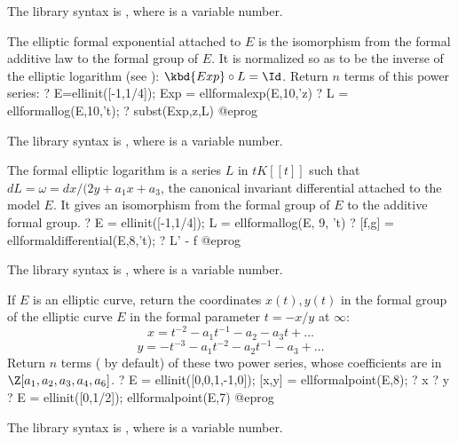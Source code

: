 The library syntax is , where  is a variable number.

\label{se:ellformalexp}
The elliptic formal exponential  attached to $E$ is the
isomorphism from the formal additive law to the formal group of $E$. It is
normalized so as to be the inverse of the elliptic logarithm (see
): $\kbd{Exp} \circ L = \Id$. Return $n$ terms of this
power series:
\bprog
? E=ellinit([-1,1/4]); Exp = ellformalexp(E,10,'z)
? L = ellformallog(E,10,'t);
? subst(Exp,z,L)
@eprog

The library syntax is , where  is a variable number.

\label{se:ellformallog}
The formal elliptic logarithm is a series $L$ in $t K[[t]]$
such that $d L = \omega = dx / (2y + a_1x + a_3$, the canonical invariant
differential attached to the model $E$. It gives an isomorphism
from the formal group of $E$ to the additive formal group.
\bprog
? E = ellinit([-1,1/4]); L = ellformallog(E, 9, 't)
? [f,g] = ellformaldifferential(E,8,'t);
? L' - f
@eprog

The library syntax is , where  is a variable number.

\label{se:ellformalpoint}
If $E$ is an elliptic curve, return the coordinates $x(t), y(t)$ in the
formal group of the elliptic curve $E$ in the formal parameter $t = -x/y$
at $\infty$:
$$ x = t^{-2} -a_1 t^{-1} - a_2 - a_3 t + \dots $$
$$ y = - t^{-3} -a_1 t^{-2} - a_2t^{-1} -a_3 + \dots $$
Return $n$ terms ( by default) of these two power
series, whose coefficients are in $\Z[a_1,a_2,a_3,a_4,a_6]$.
\bprog
? E = ellinit([0,0,1,-1,0]); [x,y] = ellformalpoint(E,8);
? x
? y
? E = ellinit([0,1/2]); ellformalpoint(E,7)
@eprog

The library syntax is , where  is a variable number.

